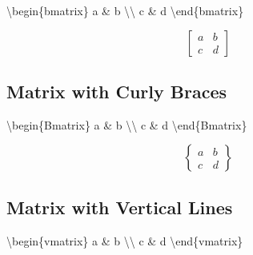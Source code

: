 \documentclass[
  letterpaper,
  DIV=11,
  numbers=noendperiod]{scrartcl}
\newenvironment{Shaded}{\begin{snugshade}}{\end{snugshade}}
\newcommand{\ExtensionTok}[1]{\textcolor[rgb]{0.00,0.23,0.31}{#1}}
\newcommand{\KeywordTok}[1]{\textcolor[rgb]{0.00,0.23,0.31}{#1}}
\newcommand{\NormalTok}[1]{\textcolor[rgb]{0.00,0.23,0.31}{#1}}
\newcommand{\SpecialCharTok}[1]{\textcolor[rgb]{0.37,0.37,0.37}{#1}}
\newcommand{\SpecialStringTok}[1]{\textcolor[rgb]{0.13,0.47,0.30}{#1}}
\begin{document}
\begin{Shaded}
\begin{Highlighting}[]
\SpecialStringTok{$$}\KeywordTok{\textbackslash{}begin}\NormalTok{\{}\ExtensionTok{bmatrix}\NormalTok{\}}
\SpecialStringTok{a \& b }\SpecialCharTok{\textbackslash{}\textbackslash{}}
\SpecialStringTok{c \& d}
\KeywordTok{\textbackslash{}end}\NormalTok{\{}\ExtensionTok{bmatrix}\NormalTok{\}}\SpecialStringTok{$$}
\end{Highlighting}
\end{Shaded}

\[\begin{bmatrix}
a & b \\
c & d
\end{bmatrix}\]

\hypertarget{matrix-with-curly-braces}{%
\subsection{Matrix with Curly Braces}\label{matrix-with-curly-braces}}

\begin{Shaded}
\begin{Highlighting}[]
\SpecialStringTok{$$}\KeywordTok{\textbackslash{}begin}\NormalTok{\{}\ExtensionTok{Bmatrix}\NormalTok{\}}
\SpecialStringTok{a \& b }\SpecialCharTok{\textbackslash{}\textbackslash{}}
\SpecialStringTok{c \& d}
\KeywordTok{\textbackslash{}end}\NormalTok{\{}\ExtensionTok{Bmatrix}\NormalTok{\}}\SpecialStringTok{$$}
\end{Highlighting}
\end{Shaded}

\[\begin{Bmatrix}
a & b \\
c & d
\end{Bmatrix}\]

\hypertarget{matrix-with-vertical-lines}{%
\subsection{Matrix with Vertical
Lines}\label{matrix-with-vertical-lines}}

\begin{Shaded}
\begin{Highlighting}[]
\SpecialStringTok{$$}\KeywordTok{\textbackslash{}begin}\NormalTok{\{}\ExtensionTok{vmatrix}\NormalTok{\}}
\SpecialStringTok{a \& b }\SpecialCharTok{\textbackslash{}\textbackslash{}}
\SpecialStringTok{c \& d}
\KeywordTok{\textbackslash{}end}\NormalTok{\{}\ExtensionTok{vmatrix}\NormalTok{\}}\SpecialStringTok{$$}
\end{Highlighting}
\end{Shaded}
\end{document}
